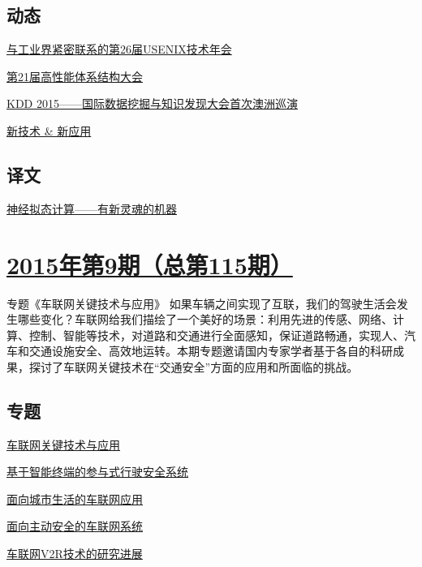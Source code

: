 \documentclass[a4paper]{article}
\begin{document}
\subsection{动态}
\href{http://history.ccf.org.cn/resources/1190201776262/2015/10/12/14.pdf}{与工业界紧密联系的第26届USENIX技术年会}

\href{http://history.ccf.org.cn/resources/1190201776262/2015/10/12/13.pdf}{第21届高性能体系结构大会}

\href{http://history.ccf.org.cn/resources/1190201776262/2015/10/12/12.pdf}{KDD 2015——国际数据挖掘与知识发现大会首次澳洲巡演}

\href{http://history.ccf.org.cn/resources/1190201776262/2015/10/12/15.pdf}{新技术 \& 新应用}

\subsection{译文}
\href{http://history.ccf.org.cn/resources/1190201776262/2015/10/12/16.pdf}{神经拟态计算——有新灵魂的机器}


\section{\href{http://history.ccf.org.cn/sites/ccf/jsjtbbd.jsp?contentId=2883909046052}{\textbf{2015年第9期（总第115期）}}}
专题《车联网关键技术与应用》
如果车辆之间实现了互联，我们的驾驶生活会发生哪些变化？车联网给我们描绘了一个美好的场景：利用先进的传感、网络、计算、控制、智能等技术，对道路和交通进行全面感知，保证道路畅通，实现人、汽车和交通设施安全、高效地运转。本期专题邀请国内专家学者基于各自的科研成果，探讨了车联网关键技术在“交通安全”方面的应用和所面临的挑战。
\subsection{专题}
\href{http://history.ccf.org.cn/resources/1190201776262/2015/09/14/1.pdf}{车联网关键技术与应用}

\href{http://history.ccf.org.cn/resources/1190201776262/2015/09/14/3.pdf}{基于智能终端的参与式行驶安全系统}

\href{http://history.ccf.org.cn/resources/1190201776262/2015/09/14/5.pdf}{面向城市生活的车联网应用}

\href{http://history.ccf.org.cn/resources/1190201776262/2015/09/14/2.pdf}{面向主动安全的车联网系统}

\href{http://history.ccf.org.cn/resources/1190201776262/2015/09/14/4.pdf}{车联网V2R技术的研究进展}
\end{document}
